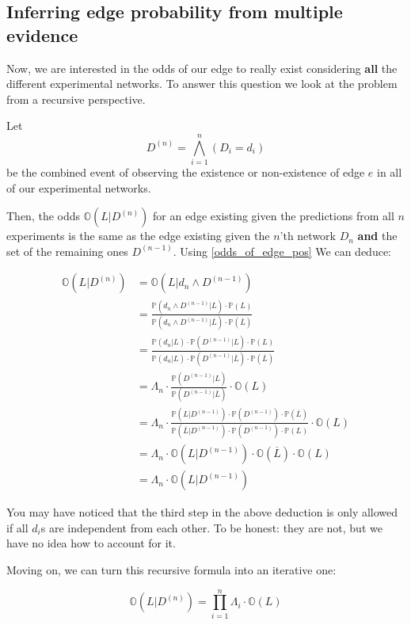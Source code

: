 \documentclass{scrartcl}
\newcommand{\prob}{\mathbb{P}}
\newcommand{\odds}{\mathbb{O}}
\begin{document}
\subsection{Inferring edge probability from multiple evidence}

Now, we are interested in the odds of our edge to really exist considering \textbf{all} the different experimental networks. To answer this question we look at the problem from a recursive perspective. 

Let $$D^{(n)} = \bigwedge_{i=1}^n (D_i = d_i)$$ be the combined event of observing the existence or non-existence of edge $e$ in all of our experimental networks.

Then, the odds $\odds(L|D^{(n)})$ for an edge existing given the predictions from all $n$ experiments is the same as the edge existing given the $n$'th network $D_n$ \textbf{and} the set of the remaining ones $D^{(n-1)}$. Using \eqref{odds_of_edge_pos} We can deduce:

\begin{align*}
\odds(L | D^{(n)} ) &= \odds(L | d_n \wedge D^{(n-1)}) \\
 &= \frac{\prob( d_n \wedge D^{(n-1)} | L) \cdot \prob(L)}{\prob( d_n \wedge D^{(n-1)} | \overline{L}) \cdot \prob(\overline{L}) } \\
 &= \frac{\prob( d_n |L) \cdot \prob( D^{(n-1)} | L) \cdot \prob(L)}{\prob( d_n |L) \cdot \prob( D^{(n-1)} | \overline{L}) \cdot \prob(\overline{L}) } \\
 &= \Lambda_n \cdot \frac{\prob( D^{(n-1)} | L)}{\prob( D^{(n-1)} | \overline{L})} \cdot \odds(L)\\
 &= \Lambda_n \cdot \frac{\prob(L| D^{(n-1)}) \cdot \prob(D^{(n-1)}) \cdot \prob(\overline{L})}{\prob(\overline{L} | D^{(n-1)}) \cdot \prob(D^{(n-1)}) \cdot \prob(L)} \cdot \odds(L) \\
 &= \Lambda_n \cdot \odds(L|D^{(n-1)}) \cdot \odds(\overline{L}) \cdot \odds(L) \\
 &= \Lambda_n \cdot \odds(L|D^{(n-1)})
\end{align*}

You may have noticed that the third step in the above deduction is only allowed if all $d_i$s are independent from each other. To be honest: they are not, but we have no idea how to account for it. 

Moving on, we can turn this recursive formula into an iterative one:

\begin{equation}
\label{main_eq}
\odds(L | D^{(n)} ) =  \prod_{i=1}^n \Lambda_i  \cdot \odds(L)
\end{equation}
\end{document}
